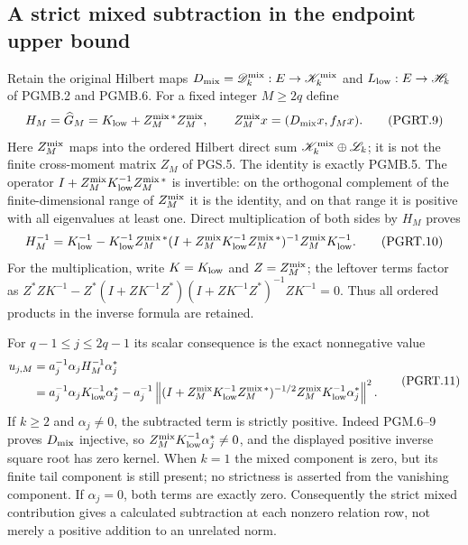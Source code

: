 \subsection{A strict mixed subtraction in the endpoint upper bound}

Retain the original Hilbert maps
$D_{\rm mix}=\mathscr D_k^{\rm mix}:E\to\mathscr K_k^{\rm mix}$
and $L_{\rm low}:E\to\mathscr H_k$ of PGMB.2 and PGMB.6.
For a fixed integer $M\geq2q$ define
\[
 H_M=\widehat G_M=K_{\rm low}+Z_M^{\rm mix\,*}Z_M^{\rm mix},
 \qquad Z_M^{\rm mix}x=(D_{\rm mix}x,f_Mx).
\tag{PGRT.9}\label{GraphV2:eq:pgrt-mixed-pair}
\]
Here $Z_M^{\rm mix}$ maps into the ordered Hilbert direct sum
$\mathscr K_k^{\rm mix}\oplus\mathscr L_k$; it is not the
finite cross-moment matrix $Z_M$ of PGS.5. The identity is
exactly PGMB.5. The operator
$I+Z_M^{\rm mix}K_{\rm low}^{-1}Z_M^{\rm mix\,*}$ is invertible:
on the orthogonal complement of the finite-dimensional range
of $Z_M^{\rm mix}$ it is the identity, and on that range it is
positive with all eigenvalues at least one. Direct multiplication
of both sides by $H_M$ proves
\[
 H_M^{-1}=K_{\rm low}^{-1}-K_{\rm low}^{-1}Z_M^{\rm mix\,*}
 (I+Z_M^{\rm mix}K_{\rm low}^{-1}Z_M^{\rm mix\,*})^{-1}
                     Z_M^{\rm mix}K_{\rm low}^{-1}.
\tag{PGRT.10}\label{GraphV2:eq:pgrt-inverse-subtraction}
\]
For the multiplication, write $K=K_{\rm low}$ and $Z=Z_M^{\rm mix}$;
the leftover terms factor as
$Z^*ZK^{-1}-Z^*(I+ZK^{-1}Z^*)(I+ZK^{-1}Z^*)^{-1}ZK^{-1}=0$.
Thus all ordered products in the inverse formula are retained.

For $q-1\leq j\leq2q-1$ its scalar consequence is the exact
nonnegative value
\[
\begin{aligned}
 u_{j,M}&=a_j^{-1}\alpha_jH_M^{-1}\alpha_j^*\\
 &=a_j^{-1}\alpha_jK_{\rm low}^{-1}\alpha_j^*
  -a_j^{-1}\left\|
 (I+Z_M^{\rm mix}K_{\rm low}^{-1}Z_M^{\rm mix\,*})^{-1/2}
                   Z_M^{\rm mix}K_{\rm low}^{-1}\alpha_j^*
                         \right\|^2.
\end{aligned}
\tag{PGRT.11}\label{GraphV2:eq:pgrt-strict-subtraction}
\]
If $k\geq2$ and $\alpha_j\ne0$, the subtracted term is strictly
positive. Indeed PGM.6--9 proves $D_{\rm mix}$ injective, so
$Z_M^{\rm mix}K_{\rm low}^{-1}\alpha_j^*\ne0$, and the displayed
positive inverse square root has zero kernel. When $k=1$ the mixed
component is zero, but its finite tail component is still present;
no strictness is asserted from the vanishing component. If
$\alpha_j=0$, both terms are exactly zero. Consequently the strict
mixed contribution gives a calculated subtraction at each nonzero
relation row, not merely a positive addition to an unrelated norm.

